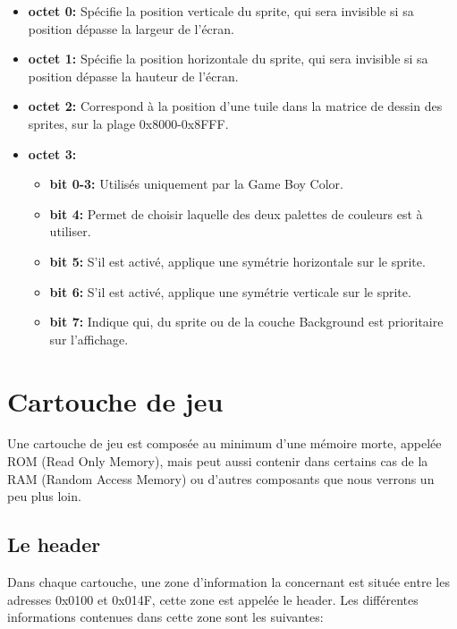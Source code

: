 \documentclass[french]{report}
\begin{document}
\begin{itemize}
\item \textbf{octet 0:}
	Spécifie la position verticale du sprite, qui sera invisible si sa position dépasse la largeur de l'écran.\\
\item \textbf{octet 1:}
	Spécifie la position horizontale du sprite, qui sera invisible si sa position dépasse la hauteur de l'écran.\\
\item \textbf{octet 2:}
	Correspond à la position d'une tuile dans la matrice de dessin des sprites, sur la plage 0x8000-0x8FFF.\\
\item \textbf{octet 3:}
	\begin{itemize}
	\item \textbf{bit 0-3:}
		Utilisés uniquement par la Game Boy Color.\\
	\item \textbf{bit 4:}
		Permet de choisir laquelle des deux palettes de couleurs est à utiliser.\\
	\item \textbf{bit 5:}
		S'il est activé, applique une symétrie horizontale sur le sprite.\\
	\item \textbf{bit 6:}
		S'il est activé, applique une symétrie verticale sur le sprite.\\
	\item \textbf{bit 7:}
		Indique qui, du sprite ou de la couche Background est prioritaire sur l'affichage. \\
	\end{itemize}
	
\end{itemize}


\section{Cartouche de jeu}
Une cartouche de jeu est composée au minimum d'une mémoire morte, appelée ROM (Read Only Memory), mais peut aussi contenir dans certains cas de la RAM (Random Access Memory) ou d'autres composants que nous verrons un peu plus loin.

\subsection{Le header}
Dans chaque cartouche, une zone d'information la concernant est située entre les adresses 0x0100 et 0x014F, cette zone est appelée le header. Les différentes informations contenues dans cette zone sont les suivantes:\\
\end{document}
